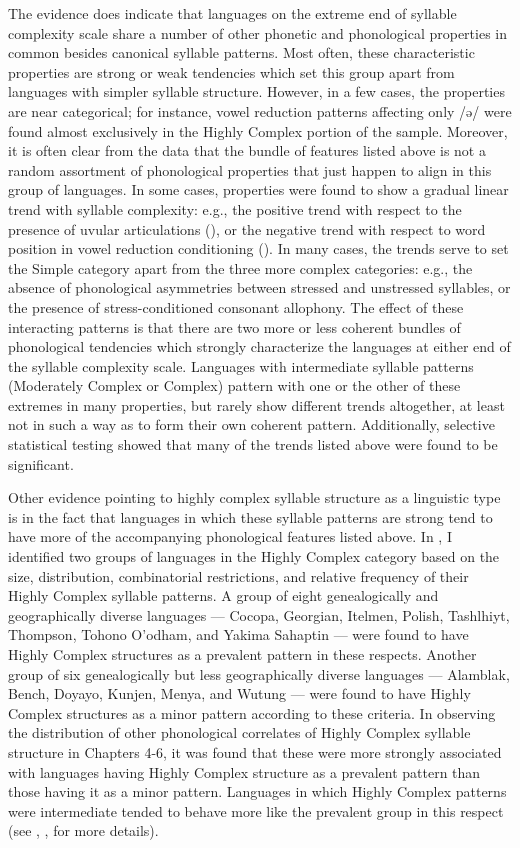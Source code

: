   The evidence does indicate that languages on the extreme end of syllable complexity scale share a number of other phonetic and phonological properties in common besides canonical syllable patterns. Most often, these characteristic properties are strong or weak tendencies which set this group apart from languages with simpler syllable structure. However, in a few cases, the properties are near categorical; for instance, vowel reduction patterns affecting only /ə/ were found almost exclusively in the Highly Complex portion of the sample. Moreover, it is often clear from the data that the bundle of features listed above is not a random assortment of phonological properties that just happen to align in this group of languages. In some cases, properties were found to show a gradual linear trend with syllable complexity: e.g., the positive trend with respect to the presence of uvular articulations (), or the negative trend with respect to word position in vowel reduction conditioning (). In many cases, the trends serve to set the Simple category apart from the three more complex categories: e.g., the absence of phonological asymmetries between stressed and unstressed syllables, or the presence of stress-conditioned consonant allophony. The effect of these interacting patterns is that there are two more or less coherent bundles of phonological tendencies which strongly characterize the languages at either end of the syllable complexity scale. Languages with intermediate syllable patterns (Moderately Complex or Complex) pattern with one or the other of these extremes in many properties, but rarely show different trends altogether, at least not in such a way as to form their own coherent pattern. Additionally, selective statistical testing showed that many of the trends listed above were found to be significant.

  Other evidence pointing to highly complex syllable structure as a linguistic type is in the fact that languages in which these syllable patterns are strong tend to have more of the accompanying phonological features listed above. In , I identified two groups of languages in the Highly Complex category based on the size, distribution, combinatorial restrictions, and relative frequency of their Highly Complex syllable patterns. A group of eight genealogically and geographically diverse languages — Cocopa, Georgian, Itelmen, Polish, Tashlhiyt, Thompson, Tohono O’odham, and Yakima Sahaptin — were found to have Highly Complex structures as a prevalent pattern in these respects. Another group of six genealogically but less geographically diverse languages — Alamblak, Bench, Doyayo, Kunjen, Menya, and Wutung — were found to have Highly Complex structures as a minor pattern according to these criteria. In observing the distribution of other phonological correlates of Highly Complex syllable structure in Chapters 4-6, it was found that these were more strongly associated with languages having Highly Complex structure as a prevalent pattern than those having it as a minor pattern. Languages in which Highly Complex patterns were intermediate tended to behave more like the prevalent group in this respect (see , ,  for more details).


